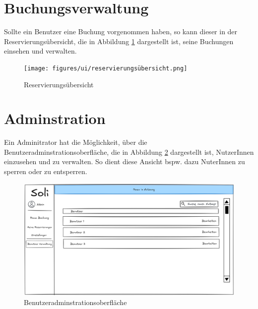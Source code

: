 \section{Buchungsverwaltung}
Sollte ein Benutzer eine Buchung vorgenommen haben, so kann dieser in der Reservierungsübersicht, die in Abbildung \ref{fig:overview} dargestellt ist, seine Buchungen einsehen und verwalten.

\begin{figure}[ht]
    \texttt{[image: figures/ui/reservierungsübersicht.png]}
    \caption{Reservierungsübersicht}
    \label{fig:overview}
\end{figure}

\clearpage
\section{Adminstration}
Ein Adminitrator hat die Möglichkeit, über die Benutzeradminstrationsoberfläche, die in Abbildung \ref{fig:adminuser} dargestellt ist, NutzerInnen einzusehen und zu verwalten.
So dient diese Ansicht bspw. dazu NuterInnen zu sperren oder zu entsperren.

\begin{figure}[ht]
    \centering
    \includegraphics[scale=0.15]{figures/ui/useradminui.png}
    \caption{Benutzeradminstrationsoberfläche}
    \label{fig:adminuser}
\end{figure}


